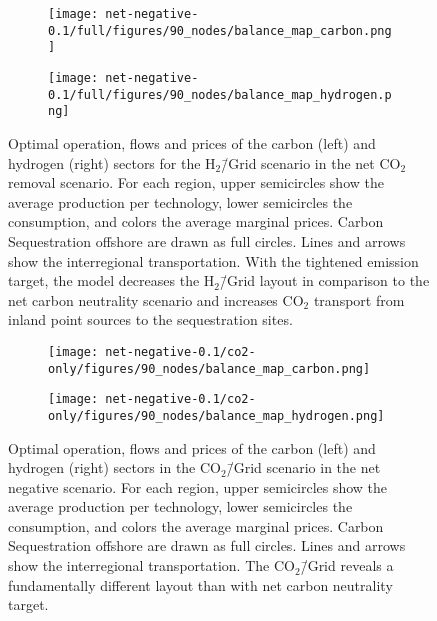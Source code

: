 \documentclass[twocolumn]{article}
\newcommand{\carbon}{CO$_2$}
\newcommand{\carbongrid}{CO$_2$\=/Grid}
\newcommand{\hydrogengrid}{H$_2$\=/Grid}
\newcommand{\carbonscenario}{CO$_2$\=/Grid scenario}
\newcommand{\hydrogenscenario}{H$_2$\=/Grid scenario}
\begin{document}
\begin{figure}[ht!]
    \centering
    \begin{subfigure}{.5\textwidth}
        \centering
        \texttt{[image: net-negative-0.1/full/figures/90\_nodes/balance\_map\_carbon.png]}
        \label{fig:balance_map_carbon_full_nn}
    \end{subfigure}%
    \begin{subfigure}{.5\textwidth}
        \centering
        \texttt{[image: net-negative-0.1/full/figures/90\_nodes/balance\_map\_hydrogen.png]}
        \label{fig:balance_map_hydrogen_full_nn}
    \end{subfigure}
    \caption{Optimal operation, flows and prices of the carbon (left) and hydrogen (right) sectors for the \hydrogenscenario{} in the net \carbon{} removal scenario. For each region, upper semicircles show the average production per technology, lower semicircles the consumption, and colors the average marginal prices. Carbon Sequestration offshore are drawn as full circles. Lines and arrows show the interregional transportation. With the tightened emission target, the model decreases the \hydrogengrid{} layout in comparison to the net carbon neutrality scenario and increases \carbon{} transport from inland point sources to the sequestration sites.
    }
    \label{fig:balance_maps_full_nn}
\end{figure}

\begin{figure}[ht!]
    \centering
    \begin{subfigure}{.5\textwidth}
        \centering
        \texttt{[image: net-negative-0.1/co2-only/figures/90\_nodes/balance\_map\_carbon.png]}
        \label{fig:balance_map_carbon_co2_nn}
    \end{subfigure}%
    \begin{subfigure}{.5\textwidth}
        \centering
        \texttt{[image: net-negative-0.1/co2-only/figures/90\_nodes/balance\_map\_hydrogen.png]}
        \label{fig:balance_map_hydrogen_co2_nn}
    \end{subfigure}
    \caption{Optimal operation, flows and prices of the carbon (left) and hydrogen (right) sectors in the \carbonscenario{} in the net negative scenario. For each region, upper semicircles show the average production per technology, lower semicircles the consumption, and colors the average marginal prices. Carbon Sequestration offshore are drawn as full circles. Lines and arrows show the interregional transportation. The \carbongrid{} reveals a fundamentally different layout than with net carbon neutrality target.
    }
    \label{fig:balance_maps_co2_nn}
\end{figure}
\end{document}
